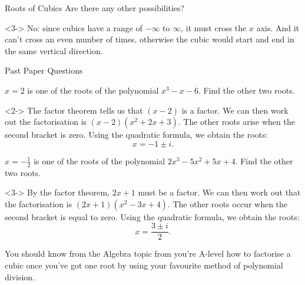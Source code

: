 \documentclass[8pt]{beamer}
\begin{document}
\begin{frame}{Roots of Cubics}
Are there any other possibilities?

\begin{solution}<3->
	No: since cubics have a range of $-\infty$ to  $\infty$, it must cross the  $x$ axis. And it can't cross an even number of times, otherwise the cubic would start and end in the same vertical direction.
\end{solution}

\end{frame}

\begin{frame}{Past Paper Questions}
	\begin{problem}
		$x=2$ is one of the roots of the polynomial $x^3-x-6$. Find the other two roots.


	\end{problem}
	\begin{solution}<2->
		The factor theorem tells us that $(x-2)$ is a factor. We can then work out the factorisation is $(x-2)(x^2+2x+3)$. The other roots arise when the second bracket is zero. Using the quadratic formula, we obtain the roots: 
		\[
		x=-1 \pm i
		.\] 
	\end{solution}
	\begin{problem}
		$x=-\frac{1}{2}$ is one of the roots of the polynomial $2x^3-5x^2+5x+4$. Find the other two roots.
	\end{problem}
	\begin{solution}<3->
		By the factor theorem, $2x+1$ must be a factor. We can then work out that the factorisation is $(2x+1)(x^2-3x+4)$. The other roots occur when the second bracket is equal to zero. Using the quadratic formula, we obtain the roots:
		\[
			x=\frac{3\pm i}{2}.
		\] 
	\end{solution}
	\alert{You should know from the Algebra topic from you're A-level how to factorise a cubic once you've got one root by using your favourite method of polynomial division.}
\end{frame}
\end{document}
